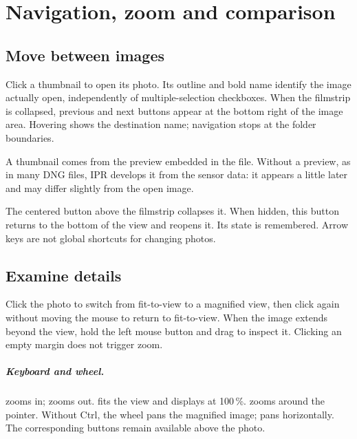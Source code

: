 \chapter{Navigation, zoom and comparison}
\label{chap:navigation}
\section{Move between images}
Click a thumbnail to open its photo. Its outline and bold name identify the
image actually open, independently of multiple-selection checkboxes. When the
filmstrip is collapsed, previous and next buttons appear at the bottom right
of the image area. Hovering shows the destination name; navigation stops at
the folder boundaries.

A thumbnail comes from the preview embedded in the file. Without a preview, as in
many DNG files, IPR develops it from the sensor data: it appears a little later
and may differ slightly from the open image.

The centered button above the filmstrip collapses it. When hidden, this button
returns to the bottom of the view and reopens it. Its state is remembered.
Arrow keys are not global shortcuts for changing photos.

\section{Examine details}
Click the photo to switch from fit-to-view to a magnified view, then click
again without moving the mouse to return to fit-to-view. When the image
extends beyond the view, hold the left mouse button and drag to inspect it.
Clicking an empty margin does not trigger zoom.

\paragraph{Keyboard and wheel.}
 zooms in;  zooms out.
 fits the view and  displays at 100\,\%.
 zooms around the pointer. Without Ctrl, the wheel pans
the magnified image;  pans horizontally.
The corresponding buttons remain available above the photo.


